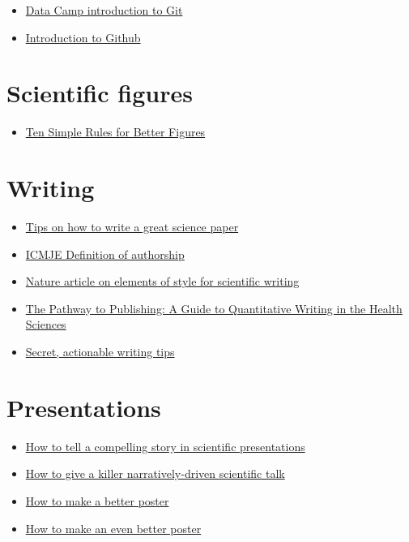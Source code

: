\documentclass[
]{book}
\providecommand{\tightlist}{%
  \setlength{\itemsep}{0pt}\setlength{\parskip}{0pt}}
\begin{document}
\begin{itemize}
\tightlist
\item
  \href{https://www.datacamp.com/courses/introduction-to-git-for-data-science}{Data Camp introduction to Git}
\item
  \href{https://lab.github.com/githubtraining/introduction-to-github}{Introduction to Github}
\end{itemize}

\section{Scientific figures}\label{scientific-figures}

\begin{itemize}
\tightlist
\item
  \href{https://journals.plos.org/ploscompbiol/article?id=10.1371/journal.pcbi.1003833}{Ten Simple Rules for Better Figures}
\end{itemize}

\section{Writing}\label{writing}

\begin{itemize}
\tightlist
\item
  \href{https://www.nature.com/articles/d41586-019-02918-5}{Tips on how to write a great science paper}
\item
  \href{http://www.icmje.org/recommendations/browse/roles-and-responsibilities/defining-the-role-of-authors-and-contributors.html}{ICMJE Definition of authorship}
\item
  \href{https://www.nature.com/articles/nphys724}{Nature article on elements of style for scientific writing}
\item
  \href{https://link.springer.com/book/10.1007/978-3-030-98175-4}{The Pathway to Publishing: A Guide to Quantitative Writing in the Health Sciences}
\item
  \href{https://x.com/acagamic/status/1680381737816424450}{Secret, actionable writing tips}
\end{itemize}

\section{Presentations}\label{presentations}

\begin{itemize}
\tightlist
\item
  \href{https://www.nature.com/articles/d41586-021-03603-2}{How to tell a compelling story in scientific presentations}
\item
  \href{https://www-sciencedirect-com.stanford.idm.oclc.org/science/article/pii/S1471491423000928}{How to give a killer narratively-driven scientific talk}
\item
  \href{https://www.youtube.com/watch?v=1RwJbhkCA58&t=1171s}{How to make a better poster}
\item
  \href{https://mitcommlab.mit.edu/be/2023/09/27/toward-an-evenbetterposter-improving-the-betterposter-template/}{How to make an even better poster}
\end{itemize}
\end{document}

